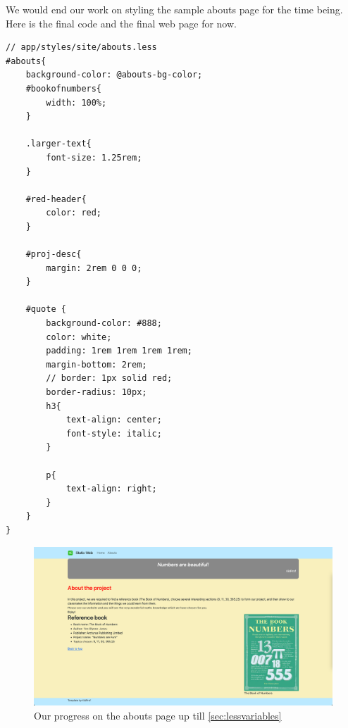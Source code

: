 We would end our work on styling the sample abouts page for the time being. Here is the final code and the final web page for now.

\begin{lstlisting}[language=pug]
// app/styles/site/abouts.less
#abouts{
    background-color: @abouts-bg-color;
    #bookofnumbers{
        width: 100%;
    }
    
    .larger-text{
        font-size: 1.25rem;
    }
    
    #red-header{
        color: red;
    }
    
    #proj-desc{
        margin: 2rem 0 0 0;
    }
    
    #quote {
        background-color: #888;
        color: white;
        padding: 1rem 1rem 1rem 1rem;
        margin-bottom: 2rem;
        // border: 1px solid red;
        border-radius: 10px;
        h3{
            text-align: center;
            font-style: italic;
        }
        
        p{
            text-align: right;
        }
    }
}
\end{lstlisting}

\begin{figure}[h]
\centering
\includegraphics[width=13cm]{images/chn6-background-colour.png}
\caption{Our progress on the abouts page up till \cref{sec:lessvariables}}
\label{fig:aboutsfinal}
\end{figure}